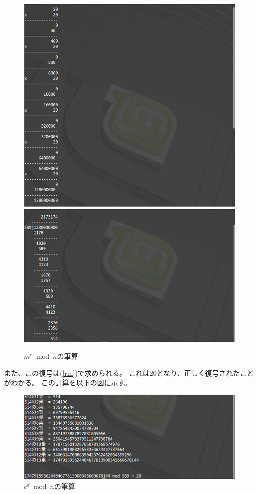 \documentclass[a4j]{jsarticle}
\begin{document}
\begin{figure}[H]
  \centering
  \includegraphics[scale = 0.50]{hissan03.png}
  \includegraphics[scale = 0.50]{hissan04.png}
  \caption{$m^e \bmod n$の筆算}
  \label{figure:m^e}
\end{figure}

また、この復号は(\ref{rm})で求められる。
これは20となり、正しく復号されたことがわかる。
この計算を以下の図に示す。

\begin{figure}[H]
  \centering
  \includegraphics[scale = 0.50]{hissan05.png}
  \caption{$c^d \bmod n$の筆算}
  \label{figure:c^d}
\end{figure}
\end{document}
